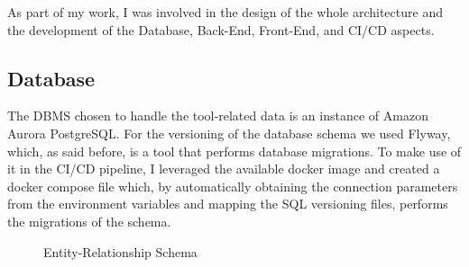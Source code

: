 As part of my work, I was involved in the design of the whole architecture and the development of the Database, Back-End, Front-End, and CI/CD aspects.

\subsection{Database}
The DBMS chosen to handle the tool-related data is an instance of Amazon Aurora PostgreSQL.
For the versioning of the database schema we used Flyway, which, as said before, is a tool that performs database migrations. To make use of it in the CI/CD pipeline, I leveraged the available docker image and created a docker compose file which, by automatically obtaining the connection parameters from the environment variables and mapping the SQL versioning files, performs the migrations of the schema. 


\begin{figure}[!htb]
    \centering
    
    \caption{Entity-Relationship Schema}
    \label{fig:ER}
\end{figure}

